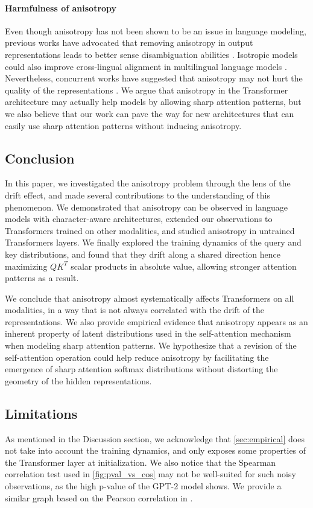 \paragraph{Harmfulness of anisotropy} Even though anisotropy has not been shown to be an issue in language modeling, previous works have advocated that removing anisotropy in output representations leads to better sense disambiguation abilities \citep{bihani-rayz-2021-low, bis-etal-2021-much}. Isotropic models could also improve cross-lingual alignment in multilingual language models \citep{hämmerl2023exploring}. Nevertheless, concurrent works have suggested that anisotropy may not hurt the quality of the representations \citep{ait-saada-nadif-2023-anisotropy, rudman2023stable}. We argue that anisotropy in the Transformer architecture may actually help models by allowing sharp attention patterns, but we also believe that our work can pave the way for new architectures that can easily use sharp attention patterns without inducing anisotropy. 


\subsection*{Conclusion}
In this paper, we investigated the anisotropy problem through the lens of the drift effect, and made several contributions to the understanding of this phenomenon. We demonstrated that anisotropy can be observed in language models with character-aware architectures, extended our observations to Transformers trained on other modalities, and studied anisotropy in untrained Transformers layers. We finally explored the training dynamics of the query and key distributions, and found that they drift along a shared direction hence maximizing $QK^T$ scalar products in absolute value, allowing stronger attention patterns as a result.

We conclude that anisotropy almost systematically affects Transformers on all modalities, in a way that is not always correlated with the drift of the representations. We also provide empirical evidence that anisotropy appears as an inherent property of latent distributions used in the self-attention mechanism when modeling sharp attention patterns. We hypothesize that a revision of the self-attention operation could help reduce anisotropy by facilitating the emergence of sharp attention softmax distributions without distorting the geometry of the hidden representations.


\subsection*{Limitations}
As mentioned in the Discussion section, we acknowledge that \autoref{sec:empirical} does not take into account the training dynamics, and only exposes some properties of the Transformer layer at initialization. We also notice that the Spearman correlation test used in \autoref{fig:pval_vs_cos} may not be well-suited for such noisy observations, as the high p-value of the GPT-2 model shows. We provide a similar graph based on the Pearson correlation in .

